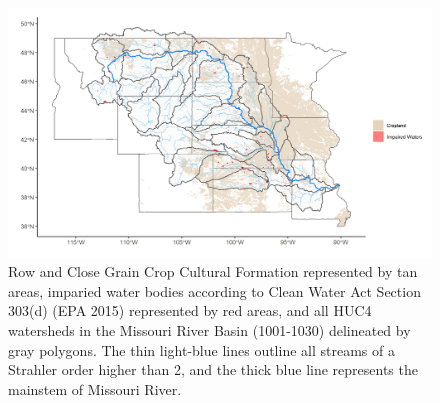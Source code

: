 \documentclass[12pt,]{article}
\makeatletter
\def\maxwidth{\ifdim\Gin@nat@width>\linewidth\linewidth\else\Gin@nat@width\fi}
\makeatother
\begin{document}
\begin{figure}
\includegraphics[width=\maxwidth]{../Figures/cropland3} \caption{\label{fig:cropland} Row and Close Grain Crop Cultural Formation represented by tan areas, imparied water bodies according to Clean Water Act Section 303(d) (EPA 2015) represented by red areas, and all HUC4 watersheds in the Missouri River Basin (1001-1030) delineated by gray polygons. The thin light-blue lines outline all streams of a Strahler order higher than 2, and the thick blue line represents the mainstem of Missouri River.}\label{fig:cropland}
\end{figure}
\end{document}
